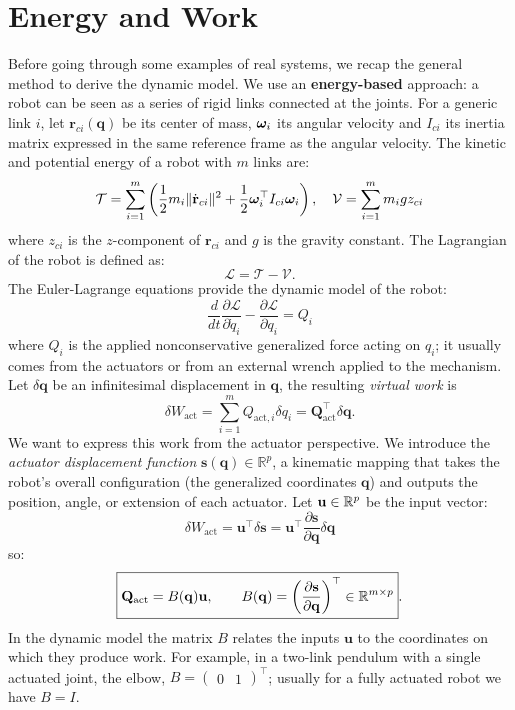 \documentclass[10pt, a4paper]{report}
\newcommand{\q}{{\mathbf q}}
\begin{document}
\section{Energy and Work}
Before going through some examples of real systems, we recap the general method to derive the dynamic model. We use an \textbf{energy-based} approach: a robot can be seen as a series of rigid links connected at the joints. For a generic link $i$, let $\mathbf r_{ci}(\q)$ be its center of mass, ${\boldsymbol{\omega}}_i$ its angular velocity and $I_{ci}$ its inertia matrix expressed in the same reference frame as the angular velocity. The kinetic and potential energy of a robot with $m$ links are:\begin{equation}
    \mathcal T = \sum_{i=1}^m\left(\frac{1}{2}m_i\|\dot{\mathbf{r}}_{ci}\|^2+\frac{1}{2}{\boldsymbol{\omega}}_i^\top I_{ci}{\boldsymbol{\omega}}_i\right),\quad 
    \mathcal V = \sum_{i=1}^m m_igz_{ci}
\end{equation}
where $z_{ci}$ is the $z$-component of $\mathbf r_{ci}$ and $g$ is the gravity constant. The Lagrangian of the robot is defined as:\begin{equation}
    \mathcal L = \mathcal T - \mathcal V.
\end{equation}
The Euler-Lagrange equations provide the dynamic model of the robot:\begin{equation}
    \frac{d}{dt}\frac{\partial\mathcal L}{\partial \dot q_i}-\frac{\partial\mathcal L}{\partial q_i}=Q_i 
\end{equation} 
where $Q_i$ is the applied nonconservative generalized force acting on $q_i$; it usually comes from the actuators or from an external wrench applied to the mechanism. Let $\delta\q$ be an infinitesimal displacement in $\q$, the resulting \textit{virtual work} is\begin{equation}
    \delta W_{\text{act}}=\sum_{i=1}^mQ_{\text{act},i}\delta q_i = \mathbf Q_{\text{act}}^\top \delta\q.
\end{equation}
We want to express this work from the actuator perspective. We introduce the \textit{actuator displacement function} $\mathbf{s}(\q) \in \mathbb{R}^p$, a kinematic mapping that takes the robot's overall configuration (the generalized coordinates $\q$) and outputs the position, angle, or extension of each actuator. Let $\mathbf u\in{\mathbb R}^p$ be the input vector:\begin{equation}
    \delta W_{\text{act}}=\mathbf u^\top\delta\mathbf s=\mathbf u^\top\frac{\partial \mathbf s}{\partial \q}\delta\q
\end{equation}
so:\begin{equation}
    \boxed{
        \mathbf Q_{\text{act}}=B(\q)\mathbf u, \qquad 
        B(\q)=\left(\frac{\partial \mathbf s}{\partial \q}\right)^\top \in \R^{m\times p}
    }.
\end{equation}
In the dynamic model the matrix $B$ relates the inputs $\mathbf u$ to the coordinates on which they produce work. For example, in a two-link pendulum with a single actuated joint, the elbow, $B=\begin{pmatrix}
    0&1
\end{pmatrix}^\top$; usually for a fully actuated robot we have $B=I$.\bigskip 
\end{document}
